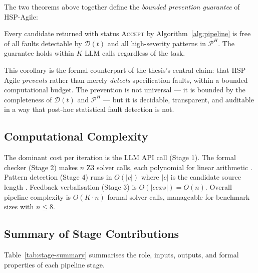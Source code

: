 The two theorems above together define the \emph{bounded prevention guarantee}
of HSP-Agile:

\begin{corollary}
\label{cor:prevention}
Every candidate returned with status \textsc{Accept} by
Algorithm~\ref{alg:pipeline} is free of all faults detectable by
$\mathcal{D}(t)$ and all high-severity patterns in $\mathcal{P}^H$.
The guarantee holds within $K$ LLM calls regardless of the task.
\end{corollary}

This corollary is the formal counterpart of the thesis's central claim: that
HSP-Agile \emph{prevents} rather than merely \emph{detects} specification
faults, within a bounded computational budget.  The prevention is not
universal — it is bounded by the completeness of $\mathcal{D}(t)$ and
$\mathcal{P}^H$ — but it is decidable, transparent, and auditable in a way
that post-hoc statistical fault detection is not.

\subsection{Computational Complexity}
\label{subsec:method:complexity}

The dominant cost per iteration is the LLM API call (Stage 1).
The formal checker (Stage 2) makes $n$ Z3 solver calls, each polynomial for
linear arithmetic \citep{barrett2018smt, demoura2008z3}.
Pattern detection (Stage 4) runs in $O(|c|)$ where $|c|$ is the candidate
source length \citep{cousot1977abstract}.
Feedback verbalisation (Stage 3) is $O(|\mathit{cexs}|) = O(n)$.
Overall pipeline complexity is $O(K \cdot n)$ formal solver calls, manageable
for benchmark sizes with $n \le 8$.

\subsection{Summary of Stage Contributions}
\label{subsec:method:stage-summary}

Table~\ref{tab:stage-summary} summarises the role, inputs, outputs, and
formal properties of each pipeline stage.


